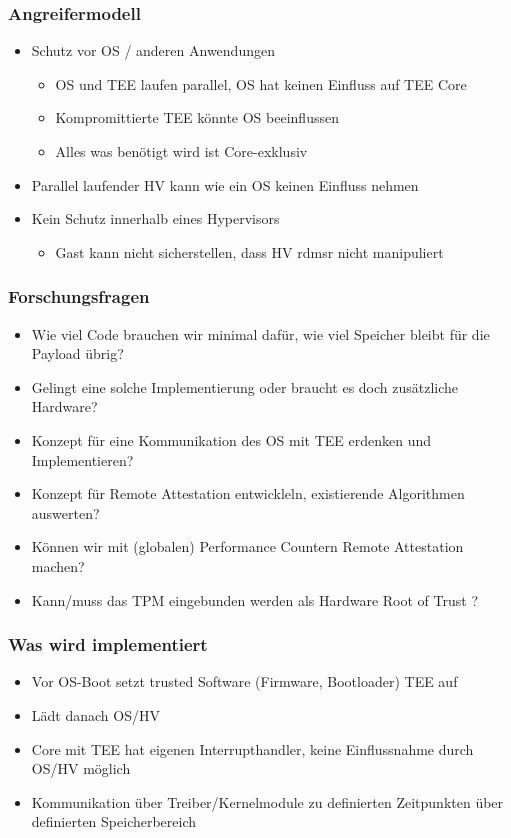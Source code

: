 \documentclass{beamer}
\begin{document}
\begin{frame}
    \frametitle{Angreifermodell}
    \begin{itemize}
        \item Schutz vor OS / anderen Anwendungen
              \begin{itemize}
                  \item OS und TEE laufen parallel, OS hat keinen Einfluss auf TEE Core
                  \item Kompromittierte TEE könnte OS beeinflussen
                  \item Alles was benötigt wird ist Core-exklusiv
              \end{itemize}
        \item Parallel laufender HV kann wie ein OS keinen Einfluss nehmen
        \item Kein Schutz innerhalb eines Hypervisors
              \begin{itemize}
                  \item Gast kann nicht sicherstellen, dass HV rdmsr nicht manipuliert
              \end{itemize}
    \end{itemize}
\end{frame}

\begin{frame}
    \frametitle{Forschungsfragen}
    \begin{itemize}
        \item Wie viel Code brauchen wir minimal dafür, wie viel Speicher bleibt für die Payload übrig?
        \item Gelingt eine solche Implementierung oder braucht es doch zusätzliche Hardware?
        \item Konzept für eine Kommunikation des OS mit TEE erdenken und Implementieren?
        \item Konzept für Remote Attestation entwickleln, existierende Algorithmen auswerten?
        \item Können wir mit (globalen) Performance Countern Remote Attestation machen?
        \item Kann/muss das TPM eingebunden werden als Hardware Root of Trust ?
    \end{itemize}
\end{frame}

\begin{frame}
    \frametitle{Was wird implementiert}
    \begin{itemize}
        \item Vor OS-Boot setzt trusted Software (Firmware, Bootloader) TEE auf
        \item Lädt danach OS/HV
        \item Core mit TEE hat eigenen Interrupthandler, keine Einflussnahme durch OS/HV möglich
        \item Kommunikation über Treiber/Kernelmodule zu definierten Zeitpunkten über definierten Speicherbereich
    \end{itemize}
\end{frame}
\end{document}
